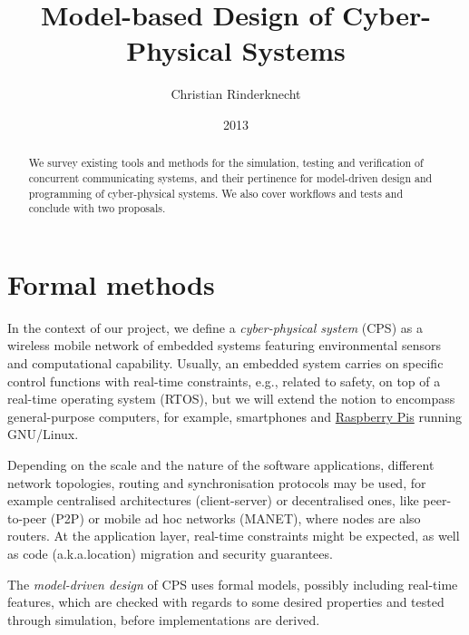 \documentclass[a4paper,11pt,twoside]{article}
\title{Model-based Design of Cyber-Physical Systems}
\author{Christian Rinderknecht}
\date{2013}
\begin{document}
\maketitle

\begin{abstract}
We survey existing tools and methods for the simulation, testing and
verification of concurrent communicating systems, and their pertinence
for model-driven design and programming of cyber\hyp{}physical
systems. We also cover workflows and tests and conclude with two
proposals.
\end{abstract}

\section{Formal methods}

In the context of our project, we define a \emph{cyber-physical
  system} (CPS) as a wireless mobile network of embedded systems
featuring environmental sensors and computational capability. Usually,
an embedded system carries on specific control functions with
real\hyp{}time constraints, e.g., related to safety, on top of a
real\hyp{}time operating system (RTOS), but we will extend the notion
to encompass general\hyp{}purpose computers, for example, smartphones
and \href{http://www.raspberrypi.org/}{Raspberry Pis} running
GNU/Linux.

Depending on the scale and the nature of the software applications,
different network topologies, routing and synchronisation protocols
may be used, for example centralised architectures
(client\hyp{}server) or decentralised ones, like
peer\hyp{}to\hyp{}peer (P2P) or mobile ad hoc networks (MANET), where
nodes are also routers. At the application layer, real\hyp{}time
constraints might be expected, as well as code (a.k.a.\@ location)
migration and security guarantees.

The \emph{model-driven design} of CPS uses formal models, possibly
including real\hyp{}time features, which are checked with regards to
some desired properties and tested through simulation, before
implementations are derived.
\end{document}
